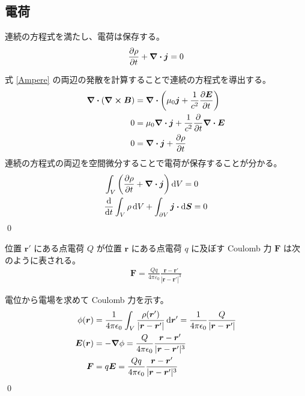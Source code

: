 \documentclass[uplatex,dvipdfmx,a4paper,11pt]{jlreq}
\makeatletter
\newcommand{\EE}{\bm{E}}
\newcommand{\BB}{\bm{B}}
\newcommand{\rr}{\bm{r}}
\theoremstyle{definition}
\renewenvironment{proof}[1][\proofname]{\par
  \normalfont
  \topsep6\p@\@plus6\p@ \trivlist
  \item[\hskip\labelsep{\bfseries #1}\@addpunct{\bfseries}]\ignorespaces\quad\par
}{%
  \qed\endtrivlist\@endpefalse
}
\renewcommand\proofname{証明}
\makeatother
\begin{document}
\subsection{電荷}
\begin{theorem}[電荷の保存則]
  連続の方程式を満たし、電荷は保存する。
  \begin{align}
    \pdv{\rho}{t} + \vnabla\vdot\bm{j} = 0
  \end{align}
\end{theorem}
\begin{proof}
  式 \eqref{Ampere} の両辺の発散を計算することで連続の方程式を導出する。
  \begin{align}
    \vnabla\vdot(\vnabla\cross\BB) & = \vnabla\vdot\qty(\mu_0\bm{j} + \frac{1}{c^2}\pdv{\EE}{t})     \\
    0                              & = \mu_0\vnabla\vdot\bm{j} + \frac{1}{c^2}\pdv{t}\vnabla\vdot\EE \\
    0                              & = \vnabla\vdot\bm{j} + \pdv{\rho}{t}
  \end{align}
  連続の方程式の両辺を空間微分することで電荷が保存することが分かる。
  \begin{align}
     & \int_V\qty(\pdv{\rho}{t} + \vnabla\vdot\bm{j})\dd{V} = 0             \\
     & \dv{t}\int_V\rho\dd{V} + \int_{\partial V}\bm{j}\vdot\dd{\bm{S}} = 0
  \end{align}
\end{proof}

\begin{theorem}
  位置 $\rr'$ にある点電荷 $Q$ が位置 $\rr$ にある点電荷 $q$ に及ぼす Coulomb 力 $\bm{F}$ は次のように表される。
  \begin{align}
    \bm{F} = \frac{Qq}{4\pi\varepsilon_0}\frac{\rr - \rr'}{|\rr - \rr'|^3}
  \end{align}
\end{theorem}
\begin{proof}
  電位から電場を求めて Coulomb 力を示す。
  \begin{align}
    \phi(\rr) & = \frac{1}{4\pi\epsilon_0}\int_V\frac{\rho(\rr')}{|\rr - \rr'|}\dd{\rr'} = \frac{1}{4\pi\epsilon_0}\frac{Q}{|\rr - \rr'|} \\
    \EE(\rr)  & = -\vnabla\phi = \frac{Q}{4\pi\epsilon_0}\frac{\rr - \rr'}{|\rr - \rr'|^3}                                                \\
    \bm{F}    & = q\EE = \frac{Qq}{4\pi\epsilon_0}\frac{\rr - \rr'}{|\rr - \rr'|^3}
  \end{align}
\end{proof}
\end{document}
